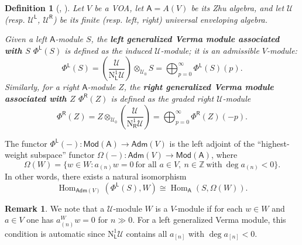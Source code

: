 \documentclass[12pt,a4paper,reqno]{amsart}
\numberwithin{equation}{section}
\newtheorem{definition}[theorem]{Definition}
\theoremstyle{definition}
\newtheorem{remark}[theorem]{Remark}
\newcommand{\Hom}{\operatorname{Hom}}
\newcommand{\N}{\mathbb{N}}
\newcommand{\Z}{\mathbb{Z}}
\newcommand{\U}{\mathcal{U}}
\def\Adm{\mathsf{Adm}}
\def\Mod{\mathsf{Mod}}
\def\L{\mathsf{L}}
\def\R{\mathsf{R}}
\def\Om{\Omega}
\def\ra{\rightarrow}
\def\scrU{\mathscr{U}}
\def\rN{\mathrm{N}}
\def\A{\mathsf{A}}
\begin{document}
\begin{definition}[{\cite[Section 6]{DLM}, \cite[Definition 3.1.1]{DGK2}}]\label{def:Verma}
Let $V$ be a VOA, let $\A=A(V)$ be its Zhu algebra, and let $\scrU$ (resp. $\scrU^\L$, $\scrU^\R$) be its finite (resp. left, right) universal enveloping algebra.

Given a left $\A$-module $S$, the \textbf{left generalized Verma module associated with $S$} $\Phi^\L(S)$ is defined as the induced $\scrU$-module; it is an admissible $V$-module:
\begin{equation}\label{eq:PhiL}
    \Phi^\L(S) = \left( \frac{\scrU}{\rN_\L^1 \scrU} \right) \otimes_{\scrU_0} S=\bigoplus_{p=0}^\infty \Phi^\L(S)(p).
\end{equation}
Similarly, for a right $\A$-module $Z$, the \textbf{right generalized Verma module associated with $Z$} $\Phi^\R(Z)$ is defined as the graded right $\scrU$-module
\begin{equation}
    \Phi^\R(Z) = Z \otimes_{\scrU_0} \left( \frac{\scrU}{\rN_\R^1 \scrU} \right)=\bigoplus_{p=0}^\infty \Phi^\R(Z)(-p).
\end{equation}
\end{definition}
The functor $\Phi^\L(-): \Mod(\A)\ra \Adm(V)$ is the left adjoint of the ``highest-weight subspace'' functor $\Om(-):\Adm(V)\ra \Mod(\A)$, where \[\Om(W)=\{w\in W: a_{(n)}w=0\ \text{for all }a\in V,\ n\in \Z\ \text{with}\ \deg a_{(n)}<0\}.\]
In other words, there exists a natural isomorphism
\[
\Hom_{\Adm(V)}(\Phi^\L(S),W)\cong \Hom_{\A}(S,\Om(W)).
\]
\begin{remark}
    We note that a $\scrU$-module $W$ is a $V$-module if for each $w\in W$ and $a\in V$ one has $a^W_{(n)}w = 0$ for $n \gg 0$. For a left generalized Verma module, this condition is automatic since $\rN^1_\L\scrU$ contains all $a_{[n]}$ with $\deg a_{[n]} < 0$.
\end{remark}
\end{document}
